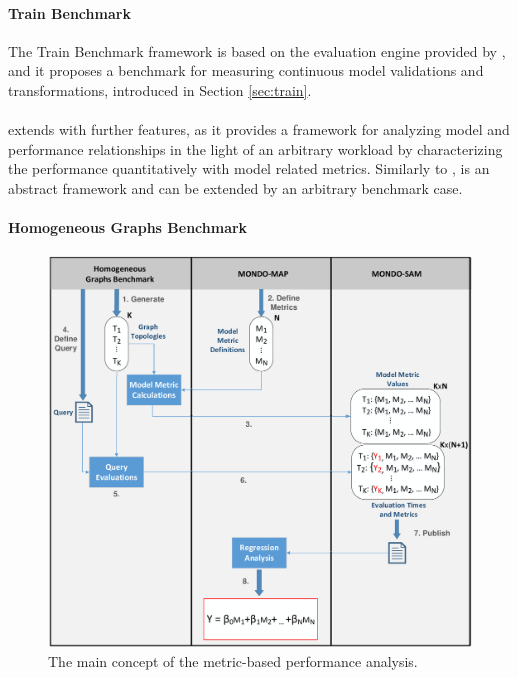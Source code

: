 \paragraph{Train Benchmark}
The Train Benchmark framework is based on the evaluation engine provided by \sam, and it proposes a benchmark for measuring continuous model validations and transformations, introduced in Section \ref{sec:train}.

\paragraph{\framework}
\framework extends \sam with further features, as it provides a framework for analyzing model and performance relationships in the light of an arbitrary workload by characterizing the performance quantitatively with model related metrics. Similarly to \sam, \map is an abstract framework and can be extended by an arbitrary benchmark case.

\paragraph{Homogeneous Graphs Benchmark}

\begin{figure}[!ht]
	\centering
	\includegraphics[width=140mm, keepaspectratio]{figures/approach.pdf}
	\caption{The main concept of the metric-based performance analysis.}
	\label{fig:approach}
\end{figure}

